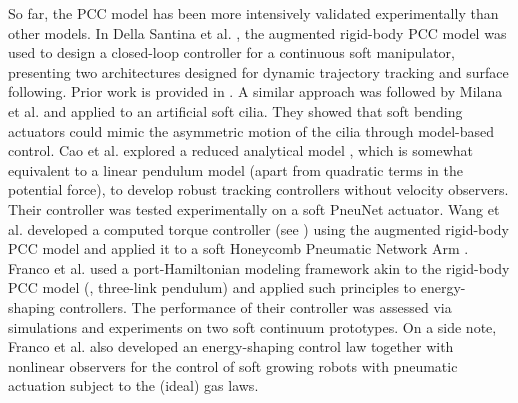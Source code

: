 So far, the PCC model has been more intensively validated experimentally than other models. In Della Santina et al. \cite{DellaSantina2020a}, the augmented rigid-body PCC model was used to design a closed-loop controller for a continuous soft manipulator, presenting two architectures designed for dynamic trajectory tracking and surface following. Prior work is provided in \cite{Katzschmann2019}. A similar approach was followed by Milana et al. \cite{Milana2021} and applied to an artificial soft cilia. They showed that soft bending actuators could mimic the asymmetric motion of the cilia through model-based control. Cao et al. \cite{Cao2021Apr} explored a reduced analytical model \cite{Wang2019Apr}, which is somewhat equivalent to a linear pendulum model (apart from quadratic terms in the potential force), to develop robust tracking controllers without velocity observers. Their controller was tested experimentally on a soft PneuNet actuator. Wang et al. \cite{Wang2022Mar} developed a computed torque controller (see \cite{Spong2006}) using the augmented rigid-body PCC model and applied it to a soft Honeycomb Pneumatic Network Arm \cite{Jiang2016Dec}. Franco et al. \cite{Franco2020,Franco2020Jan} used a port-Hamiltonian modeling framework akin to the rigid-body PCC model (\ie, three-link pendulum) and applied such principles to energy-shaping controllers. The performance of their controller was assessed via simulations and experiments on two soft continuum prototypes. On a side note, Franco et al. \cite{Franco2022May} also developed an energy-shaping control law together with nonlinear observers for the control of soft growing robots \cite{Hawkes2017} with pneumatic actuation subject to the (ideal) gas laws.

